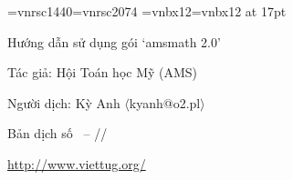 


\pagestyle{headings}

\makeindex




\thispagestyle{empty}

\begingroup
	{\font\mysign=vnrsc1440\relax\font\ftitle=vnrsc2074}%
	{\font\mysign=vnbx12\relax\font\ftitle=vnbx12 at 17pt}
	\null
	\vskip6cm
	\centerline{\ftitle Hướng dẫn sử dụng gói `amsmath 2.0'}
	\vskip30mm
	\centerline{\mysign	Tác giả: Hội Toán học Mỹ (AMS)}
	\vskip3mm
	\centerline{\mysign Người dịch: Kỳ Anh $\langle${kyanh@o2.pl}$\rangle$}
	\vskip25mm
	\centerline{\Large Bản dịch số
		{\mysign\the\buildnum\ -- \the\year/\the\month/\the\day}}
	\vfill
	\centerline{\LARGE\url{http://www.viettug.org/}}
\endgroup

\ifx\printversion\undefined
	\newpage
\else
	\cleardoublepage
\fi

